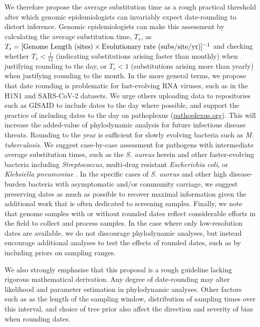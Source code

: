 \documentclass[12pt]{article}
\begin{document}
\begin{spacing}{2}
 We therefore propose the average substitution time as a rough practical threshold after which genomic epidemiologists can invariably expect date-rounding to distort inference. Genomic epidemiologists can make this assessment by calculating the average substitution time, $T_s$, as $T_s = [\textnormal{Genome Length (sites)}\times\textnormal{Evolutionary rate (subs/site/yr)}]^{-1}$ and checking whether $T_s < \frac{1}{12}$ (indicating substitutions arising faster than monthly) when justifying rounding to the day, or $T_s < 1$ (substitutions arising more than yearly) when justifying rounding to the month. In the more general terms, we propose that date rounding is problematic for fast-evolving RNA viruses, such as in the H1N1 and SARS-CoV-2 datasets. We urge others uploading data to repositories such as GISAID to include dates to the day where possible, and support the practice of including dates to the day on pathoplexus (\href{pathoplexus.org}{pathoplexus.org}). This will increase the added-value of phylodynamic analysis for future infectious disease threats. Rounding to the year is sufficient for slowly evolving bacteria such as \textit{M. tuberculosis}. We suggest case-by-case assessment for pathogens with intermediate average substitution times, such as the \textit{S. aureus} herein and other faster-evolving bacteria including \textit{Streptococcus}, multi-drug resistant \textit{Escherichia coli}, or \textit{Klebsiella pneumoniae} \citep{gorrie_antimicrobial-resistant_2018,sherry_multi-site_2022,xie_temporal_2024}. In the specific cases of \textit{S. aureus} and other high disease-burden bacteria with asymptomatic and/or community carriage, we suggest preserving dates as much as possible to recover maximal information given the additional work that is often dedicated to screening samples. Finally, we note that genome samples with or without rounded dates reflect considerable efforts in the field to collect and process samples. In the case where only low-resolution dates are available, we do not discourage phylodynamic analyses, but instead encourage additional analyses to test the effects of rounded dates, such as by including priors on sampling ranges.

 We also strongly emphasise that this proposal is a rough guideline lacking rigorous mathematical derivation. Any degree of date-rounding may alter likelihood and parameter estimation in phylodynamic analyses. Other factors such as as the length of the sampling window, distribution of sampling times over this interval, and choice of tree prior also affect the direction and severity of bias when rounding dates.  


\end{spacing}
\end{document}
